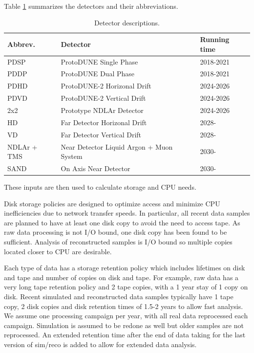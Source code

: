 \documentclass[12pt]{article}
\begin{document}
 Table \ref{tab:detectors} summarizes the detectors and their abbreviations. 

\begin{table}[h]
\begin{centering}
  \begin{tabular}{|l|l|l|}
     \hline
    Abbrev. & Detector & Running time\\
    \hline
    PDSP & ProtoDUNE Single Phase & 2018-2021\\
    PDDP & ProtoDUNE Dual Phase & 2018-2021\\
    PDHD & ProtoDUNE-2 Horizonal Drift & 2024-2026\\
    PDVD & ProtoDUNE-2 Vertical Drift & 2024-2026\\
    2x2& Prototype NDLAr Detector & 2024-2026\\
    HD & Far Detector Horizonal Drift & 2028-\\
    VD & Far Detector Vertical Drift & 2028-\\
    NDLAr + TMS & Near Detector Liquid Argon + Muon System & 2030-\\
    SAND & On Axis Near Detector & 2030- \\
     \hline
     \end{tabular}
       \caption{Detector descriptions.}\label{tab:detectors}
  \end{centering}
   
     \end{table}


These inputs are then used to calculate storage and CPU needs. 

Disk storage policies are designed to optimize access and minimize CPU inefficiencies due to network transfer speeds.  In particular, all recent data samples are planned to have at least one disk copy to avoid the need to access tape.  As raw data processing is not I/O bound, one disk copy has been found to be sufficient.  Analysis of reconstructed samples is I/O bound so multiple copies located closer to CPU are desirable. 

Each type of data has a storage retention policy which includes lifetimes on disk and tape and number of copies on disk and tape.  For example, raw data has a very long tape retention policy and 2 tape copies, with a 1 year stay of 1 copy on disk.   Recent simulated and reconstructed data samples typically have 1 tape copy, 2 disk copies and disk retention times of 1.5-2 years to allow fast analysis.   We assume one processing campaign per year, with all real data reprocessed each campaign.   Simulation is assumed to be redone as well but older samples are not reprocessed.  An extended retention time after the end of data taking for the last version of sim/reco is added to allow for extended data analysis. 
\end{document}
